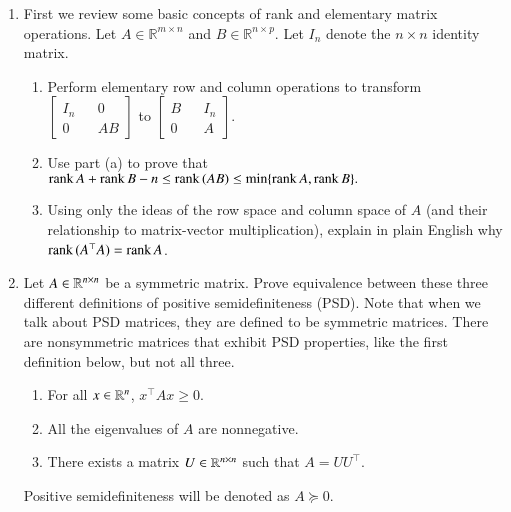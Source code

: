 \documentclass[11pt]{article}
\begin{document}
\begin{enumerate}
    \item First we review some basic concepts of rank and elementary matrix operations. Let $A \in \mathbb{R}^{m \times n}$ and $B \in \mathbb{R}^{n \times p}$. Let $I_n$ denote the $n \times n$ identity matrix.
    \begin{enumerate}
        \item Perform elementary row and column operations to transform $\begin{bmatrix} I_n && 0 \\ 0 && AB \end{bmatrix}$ to $\begin{bmatrix} B && I_n \\ 0 && A \end{bmatrix}$.
        \item Use part (a) to prove that $\mathrm{rank}\, A+\mathrm{rank}\, B - n \leq \mathrm{rank}\, (AB) \leq \text{min}\{\mathrm{rank}\, A,\mathrm{rank}\, B\}.$
        \item Using only the ideas of the row space and column space of $A$ (and their relationship to matrix-vector multiplication), explain in plain English why $\mathrm{rank}\, (A^\top A) = \mathrm{rank}\, A$.
    \end{enumerate}
    
    
    
    \item Let $A\in\mathbb{R}^{n\times n}$ be a symmetric matrix. Prove equivalence between these three different definitions of positive semidefiniteness (PSD). Note that when we talk about PSD matrices, they are defined to be symmetric matrices. There are nonsymmetric matrices that exhibit PSD properties, like the first definition below, but not all three.
    \begin{enumerate}
        \item For all $x\in\mathbb{R}^n$, $x^\top Ax\geq 0$.
        \item All the eigenvalues of $A$ are nonnegative.
        \item There exists a matrix $U\in\mathbb{R}^{n\times n}$ such that $A = UU^\top $.
    \end{enumerate}
    Positive semidefiniteness will be denoted as $A\succeq 0$. 
    
    
    

\end{enumerate}
\end{document}
